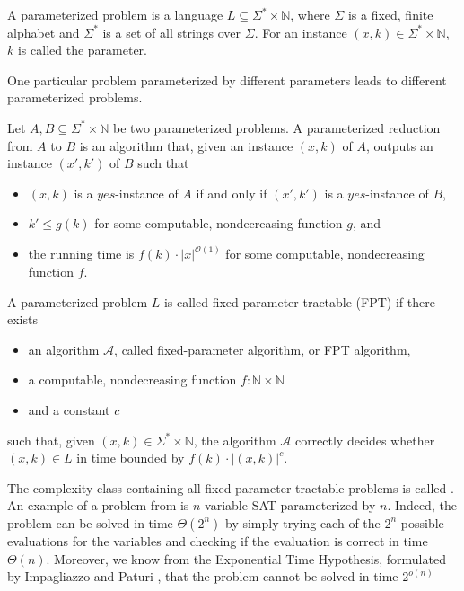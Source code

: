 \begin{definition}
    A parameterized problem is a language $L \subseteq \Sigma^* \times \mathbb{N}$, where
    $\Sigma$ is a fixed, finite alphabet and $\Sigma^*$ is a set of all strings over $\Sigma$.
    For an instance $(x, k) \in \Sigma^* \times \mathbb{N}$, $k$ is called the parameter.
\end{definition}

One particular problem parameterized by different parameters leads to different parameterized problems.

\begin{definition}
    Let $A,B \subseteq \Sigma^* \times \mathbb{N}$ be two parameterized problems.
    A parameterized reduction from $A$ to $B$ is an algorithm that, given an instance $(x, k)$ of $A$,
    outputs an instance $(x', k')$ of $B$ such that
    \begin{itemize}
        \item $(x, k)$ is a $yes$-instance of $A$ if and only if $(x', k')$ is a $yes$-instance of $B$,
        \item $k' \leq g(k)$ for some computable, nondecreasing function $g$, and
        \item the running time is $f(k) \cdot |x|^{\mathcal{O}(1)}$ for some computable, nondecreasing function $f$.
    \end{itemize}
\end{definition}

\begin{definition}[FPT]
    A parameterized problem $L$ is called fixed-parameter tractable (FPT) if there exists
    \begin{itemize}
        \item an algorithm $\mathcal{A}$, called fixed-parameter algorithm, or FPT algorithm,
        \item a computable, nondecreasing function $f : \mathbb{N} \times \mathbb{N}$
        \item and a constant $c$
    \end{itemize}
    such that, given $(x,k) \in \Sigma^* \times \mathbb{N}$,
    the algorithm $\mathcal{A}$ correctly decides whether $(x, k) \in L$ in time bounded by
    $f(k) \cdot |(x,k)|^c$.
\end{definition}

The complexity class containing all fixed-parameter tractable problems is called \FPT.
An example of a problem from \FPT is $n$-variable \textsc{SAT} parameterized by $n$.
Indeed, the problem can be solved in time $\Theta(2^n)$ by simply trying each of the $2^n$
possible evaluations for the variables and checking if the evaluation is correct in time $\Theta(n)$.
Moreover, we know from the Exponential Time Hypothesis, formulated by Impagliazzo and Paturi \cite{Impagliazzo1999},
that the problem cannot be solved in time $2^{o(n)}$


